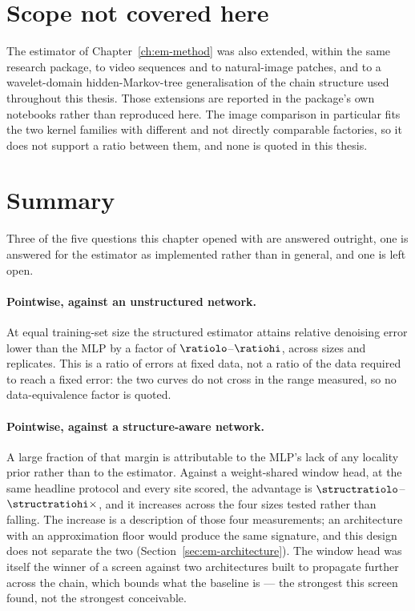 \section{Scope not covered here}

The estimator of Chapter~\ref{ch:em-method} was also extended, within the
same research package, to video sequences and to natural-image patches, and
to a wavelet-domain hidden-Markov-tree generalisation of the chain structure
used throughout this thesis. Those extensions are reported in the package's
own notebooks rather than reproduced here. The image comparison in
particular fits the two kernel families with different and not directly
comparable factories, so it does not support a ratio between them, and none
is quoted in this thesis.

\section{Summary}

Three of the five questions this chapter opened with are answered outright, one
is answered for the estimator as implemented rather than in general, and one is
left open.

\paragraph{Pointwise, against an unstructured network.} At equal training-set
size the structured estimator attains relative denoising error lower than the
MLP by a factor of $\ratiolo$--$\ratiohi$, across \nsizesused{} sizes and
\nseedsused{} replicates. This is a ratio of errors at fixed data, not a ratio
of the data required to reach a fixed error: the two curves do not cross in the
range measured, so no data-equivalence factor is quoted.

\paragraph{Pointwise, against a structure-aware network.} A large fraction of
that margin is attributable to the MLP's lack of any locality prior rather than
to the estimator. Against a weight-shared window head, at the same headline
protocol and every site scored, the advantage is
$\structratiolo$--$\structratiohi\times$, and it increases across the four sizes
tested rather than falling. The increase is a description of those four
measurements; an architecture with an approximation floor would produce the same
signature, and this design does not separate the two
(Section~\ref{sec:em-architecture}). The window head was itself the winner of a
screen against two architectures built to propagate further across the chain,
which bounds what the baseline is --- the strongest this screen found, not the
strongest conceivable.

